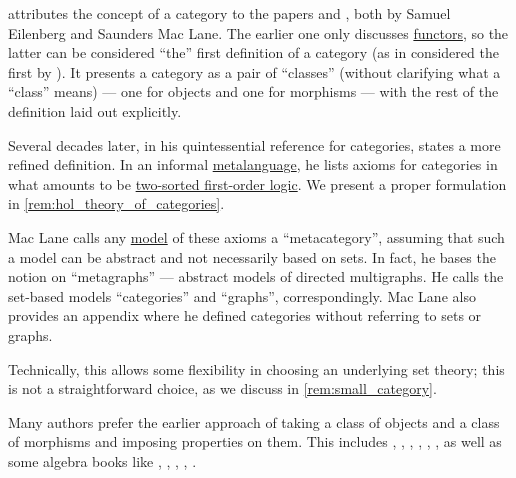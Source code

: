 \begin{remark}\label{rem:category_as_graph}
  \Textcite[37]{Johnstone1982StoneSpaces} attributes the concept of a category to the papers \cite{EilenbergMacLane1942NaturalIsomorphisms} and \cite{EilenbergMacLane1945NaturalEquivalences}, both by Samuel Eilenberg and Saunders Mac Lane. The earlier one only discusses \hyperref[def:functor]{functors}, so the latter can be considered \enquote{the} first definition of a category (as in considered the first by \textcite[1]{Awodey2010CategoryTheory}). It presents a category as a pair of \enquote{classes} (without clarifying what a \enquote{class} means) --- one for objects and one for morphisms --- with the rest of the definition laid out explicitly.

  Several decades later, in his quintessential reference for categories, \textcite[ch. I]{MacLane1998CategoryTheory} states a more refined definition. In an informal \hyperref[con:metalanguage]{metalanguage}, he lists axioms for categories in what amounts to be \hyperref[def:many_sorted_fol]{two-sorted first-order logic}. We present a proper formulation in \cref{rem:hol_theory_of_categories}.

  Mac Lane calls any \hyperref[con:logical_model]{model} of these axioms a \enquote{metacategory}, assuming that such a model can be abstract and not necessarily based on sets. In fact, he bases the notion on \enquote{metagraphs} --- abstract models of directed multigraphs. He calls the set-based models \enquote{categories} and \enquote{graphs}, correspondingly. Mac Lane also provides an appendix where he defined categories without referring to sets or graphs.

  Technically, this allows some flexibility in choosing an underlying set theory; this is not a straightforward choice, as we discuss in \cref{rem:small_category}.

  Many authors prefer the earlier approach of taking a class of objects and a class of morphisms and imposing properties on them. This includes
  \cite[def. 1.1.1]{Schubert1972Categories}
  \cite[def. 1.1.1]{Perrone2024StartingCategoryTheory},
  \cite[def. 1.1]{Awodey2010CategoryTheory},
  \cite[def. 1.1.1]{Riehl2016CategoryTheory},
  \cite[def. 1.1.1]{Leinster2014BasicCategoryTheory},
  \cite[def. 3.1]{AdámekHerrlichStrecker2004JoyOfCats},
  \cite[def. I.1.1]{ЦаленкоШульгейфер1974ОсновыТеорииКатегорий},
  as well as some algebra books like
  \cite[def. I.3.1]{Aluffi2009Algebra},
  \cite[53]{Lang2002Algebra},
  \cite[689]{Eisenbud1995CommutativeAlgebra},
  \cite[def. 1.1]{Jacobson1989BasicAlgebraII},
  \cite[268]{Шафаревич2019ОсновныеПонятияАлгебры}.
\end{remark}

